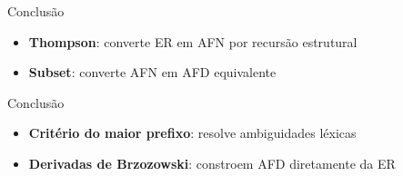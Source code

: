 \begin{frame}{Conclusão}

    \begin{itemize}

        \item
        \textbf{Thompson}: converte ER em AFN por recursão estrutural
        \item
        \textbf{Subset}: converte AFN em AFD equivalente
    \end{itemize}
\end{frame}

\begin{frame}{Conclusão}

    \begin{itemize}

        \item
        \textbf{Critério do maior prefixo}: resolve ambiguidades léxicas
        \item
        \textbf{Derivadas de Brzozowski}: constroem AFD diretamente da ER
    \end{itemize}
\end{frame}

